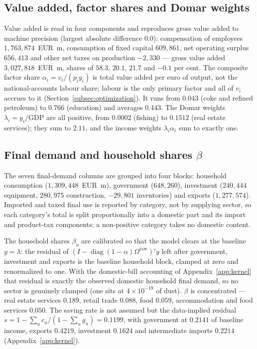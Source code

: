 \subsection{Value added, factor shares and Domar weights}\label{app:pipeline-va}

Value added is read in four components and reproduces gross value added to
machine precision (largest absolute difference $0.0$): compensation of employees
$1{,}763{,}874$~EUR~m, consumption of fixed capital $609{,}861$, net operating
surplus $656{,}413$ and other net taxes on production $-2{,}330$ --- gross
value added $3{,}027{,}818$~EUR~m, shares of $58.3$, $20.1$, $21.7$ and $-0.1$
per cent. The composite factor share
$\alpha_i=v_i/(p_iy_i)$ is total value added per euro of output, not the
national-accounts labour share; labour is the only primary factor and all of
$v_i$ accrues to it (Section~\ref{subsec:optimization}). It runs
from $0.043$ (coke and refined petroleum) to $0.766$ (education) and averages
$0.443$. The Domar weights $\lambda_i=y_i/\text{GDP}$ are all positive, from
$0.0002$ (fishing) to $0.1512$ (real estate services); they sum to $2.11$, and
the income weights $\lambda_i\alpha_i$ sum to exactly one.

\subsection{Final demand and household shares $\beta$}\label{app:pipeline-fd}

The seven final-demand columns are grouped into four blocks:
household consumption ($1{,}309{,}448$~EUR~m), government
($648{,}260$), investment ($240{,}444$ equipment, $280{,}975$ construction,
$-29{,}801$ inventories) and exports ($1{,}277{,}574$). Imported and taxed final
use is reported by category, not by supplying sector, so each category's total
is split proportionally into a domestic part and its import and product-tax
components; a non-positive category takes no domestic content.

The household shares $\beta_u$ are calibrated so that the model clears at the
baseline $y=\lambda$: the residual of
$(I-\operatorname{diag}(1-\alpha)\Omega^{\mathrm{raw}})'y$ left after government,
investment and exports is the baseline household block, clamped at zero and
renormalized to one. With the domestic-bill accounting of
Appendix~\ref{app:kernel} that residual is exactly the observed domestic
household final demand, so no sector is genuinely clamped (one sits at
$4\times10^{-19}$ of dust). $\beta$ is concentrated --- real estate services
$0.189$, retail trade $0.088$, food $0.059$, accommodation and food services
$0.050$. The saving rate is not assumed but the data-implied residual
$s=1-\sum_u c_u/(1-\sum_u g_u)=0.1199$, with government at $0.2141$ of baseline
income, exports $0.4219$, investment $0.1624$ and intermediate imports $0.2214$
(Appendix~\ref{app:kernel}).

